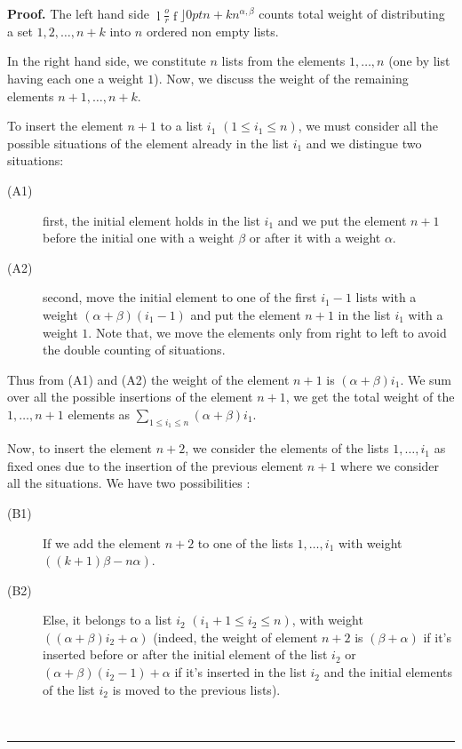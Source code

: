 \documentclass{article}
\newcommand {\lah}[2]{\genfrac\lfloor \rfloor{0pt}{}{#1}{#2}}
\newenvironment{proof}[1][Proof]{\noindent\textbf{#1.} }{\ \rule{0.5em}{0.5em}}
\begin{document}
\begin{proof}
The left hand side $\lah{n+k}{n}^{\alpha ,\beta }$ counts
total weight of distributing a set $1,2,\ldots,n+k$ into $n$ ordered non empty lists.

In the right hand side, we constitute $n$ lists from the elements $1,\ldots
,n$ (one by list having each one a weight $1$). Now, we discuss the weight
of the remaining elements $n+1,\ldots ,n+k$.

To insert the element $n+1$ to a list $i_{1}$ $(1\leq i_{1}\leq n)$, we must
consider all the possible situations of the element already in the list $%
i_{1}$ and we distingue two situations:
\begin{description}
  \item[(A1)] first, the initial element holds in the list $i_{1}$ and we put the
element $n+1$ before the initial one with a weight $\beta $ or after it with
a weight $\alpha $.
  \item[(A2)] second, move the initial element to one of the first $i_{1}-1$ lists with
a weight $\left( \alpha +\beta \right) (i_{1}-1)$ and put the element $n+1$
in the list $i_{1}$ with a weight $1$. Note that, we move the elements only
from right to left to avoid the double counting of situations.
\end{description}

Thus from (A1) and (A2) the weight of the element $n+1$ is $\left( \alpha +\beta \right)
i_{1}$. We sum over all the possible insertions of the element $n+1$, we get
the total weight of the $1,\ldots ,n+1$ elements as $\sum_{1\leq i_{1}\leq
n}\left( \alpha +\beta \right) i_{1}$.

Now, to insert the element $n+2$, we consider the elements of the lists $1,\ldots
,i_{1}$ as fixed ones due to the insertion of the previous element $n+1$
where we consider all the situations. We have two possibilities :
\begin{description}
  \item[(B1)] If we add the element $n+2$ to one of the lists $1,\ldots ,i_{1}$ with
weight $\left( \left( k+1\right) \beta -n\alpha \right) $.

  \item[(B2)] Else, it belongs to a list $i_{2}$ $\left( i_{1}+1\leq i_{2}\leq
n\right) $, with weight $\left( \left( \alpha +\beta \right) i_{2}+\alpha
\right) $ (indeed, the weight of element $n+2$ is $\left( \beta +\alpha \right) $ if it's inserted before or after the initial element of the list $i_{2}$ or $\left(\alpha +\beta \right) (i_{2}-1)+\alpha $ if it's inserted in the list $i_{2}$ and the initial
elements of the list $i_{2}$ is moved to the previous lists).
\end{description}


\end{proof}
\end{document}
